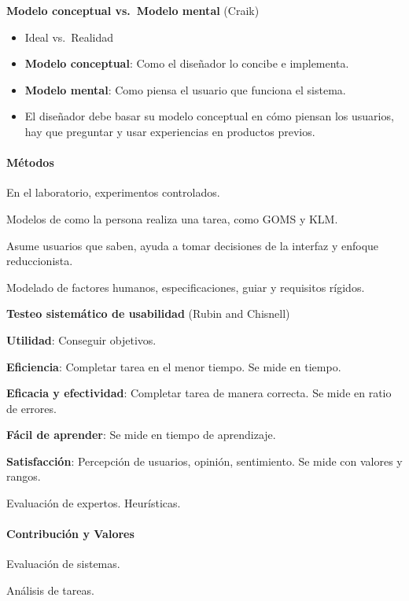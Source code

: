 \textbf{Modelo conceptual vs.~Modelo mental} (Craik)

\begin{itemize}
\item
  Ideal vs.~Realidad
\item
  \textbf{Modelo conceptual}: Como el diseñador lo concibe e implementa.
\item
  \textbf{Modelo mental}: Como piensa el usuario que funciona el
  sistema.
\item
  El diseñador debe basar su modelo conceptual en cómo piensan los
  usuarios, hay que preguntar y usar experiencias en productos previos.
\end{itemize}

\hypertarget{muxe9todos}{%
\paragraph{Métodos}\label{muxe9todos}}

En el laboratorio, experimentos controlados.

Modelos de como la persona realiza una tarea, como GOMS y KLM.

Asume usuarios que saben, ayuda a tomar decisiones de la interfaz y
enfoque reduccionista.

Modelado de factores humanos, especificaciones, guiar y requisitos
rígidos.

\textbf{Testeo sistemático de usabilidad} (Rubin and Chisnell)

\textbf{Utilidad}: Conseguir objetivos.

\textbf{Eficiencia}: Completar tarea en el menor tiempo. Se mide en
tiempo.

\textbf{Eficacia y efectividad}: Completar tarea de manera correcta. Se
mide en ratio de errores.

\textbf{Fácil de aprender}: Se mide en tiempo de aprendizaje.

\textbf{Satisfacción}: Percepción de usuarios, opinión, sentimiento. Se
mide con valores y rangos.

Evaluación de expertos. Heurísticas.

\hypertarget{contribuciuxf3n-y-valores}{%
\paragraph{Contribución y Valores}\label{contribuciuxf3n-y-valores}}

Evaluación de sistemas.

Análisis de tareas.

